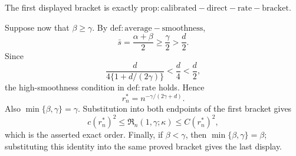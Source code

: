 The first displayed bracket is exactly \(\mathrm{prop:calibrated-direct-rate-bracket}\).

Suppose now that \(\beta\ge\gamma\). By \(\mathrm{def:average-smoothness}\),
\[
 \bar s=\frac{\alpha+\beta}{2}\ge\frac{\gamma}{2}>\frac d2.
\]
Since
\[
 \frac{d}{4\{1+d/(2\gamma)\}}<\frac d4<\frac d2,
\]
the high-smoothness condition in \(\mathrm{def:rate}\) holds. Hence
\[
 r_n^*=n^{-\gamma/(2\gamma+d)}.
\]
Also \(\min\{\beta,\gamma\}=\gamma\). Substitution into both endpoints of the first bracket gives
\[
 c(r_n^*)^2
 \le \mathfrak R_n(1,\gamma;\kappa)
 \le C(r_n^*)^2,
\]
which is the asserted exact order. Finally, if \(\beta<\gamma\), then \(\min\{\beta,\gamma\}=\beta\); substituting this identity into the same proved bracket gives the last display.